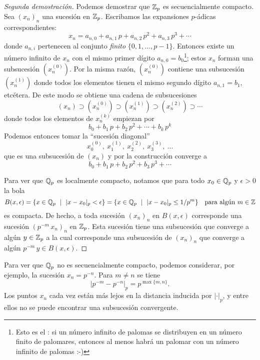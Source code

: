 \documentclass{article}
\numberwithin{equation}{section}
\theoremstyle{definition}
\begin{document}
\begin{proof}[Segunda demostración]
  Podemos demostrar que $\mathbb{Z}_p$ es secuencialmente compacto. Sea $(x_n)_n$ una
  sucesión en $\mathbb{Z}_p$. Escribamos las expansiones $p$-ádicas correspondientes:
  $$x_n = a_{n,0} + a_{n,1}\,p + a_{n,2}\,p^2 + a_{n,3}\,p^3 + \cdots$$
  donde $a_{n,i}$ pertenecen al conjunto \emph{finito}
  $\{ 0, 1, \ldots, p-1 \}$. Entonces existe un número infinito de $x_n$
  con el mismo primer dígito $a_{n,0} = b_0$\footnote{Esto es el : si un número infinito de palomas se distribuyen en
    un número finito de palomares, entonces al menos habrá un palomar con un
    número infinito de palomas :-)}; estos $x_n$ forman una subsucesión
  $(x_n^{(0)})$. Por la misma razón, $(x_n^{(0)})$ contiene una subsucesión
  $(x_n^{(1)})$ donde todos los elementos tienen el mismo segundo dígito
  $a_{n,1} = b_1$, etcétera. De este modo se obtiene una cadena de subsucesiones
  $$(x_n) \supset (x_n^{(0)}) \supset (x_n^{(1)}) \supset (x_n^{(2)}) \supset \cdots$$
  donde todos los elementos de $x_n^{(k)}$ empiezan por
  $$b_0 + b_1\,p + b_2\,p^2 + \cdots + b_k\,p^k$$
  Podemos entonces tomar la ``sucesión diagonal''
  $$x_0^{(0)}, ~ x_1^{(1)}, ~ x_2^{(2)}, ~ x_3^{(3)}, ~ \ldots$$
  que es una subsucesión de $(x_n)$ y por la construcción converge a
  $$b_0 + b_1\,p + b_2\,p^2 + b_3\,p^3 + \cdots$$

  Para ver que $\mathbb{Q}_p$ es localmente compacto, notamos que para todo
  $x_0\in \mathbb{Q}_p$ y $\epsilon > 0$ la bola
  \[ B (x,\epsilon) =
     \{ x \in \mathbb{Q}_p ~\mid~ |x-x_0|_p < \epsilon \} =
     \{ x \in \mathbb{Q}_p ~\mid~ |x-x_0|_p \le 1/p^m \}
     \quad\text{para algún }m\in\mathbb{Z} \]
  es compacta. De hecho, a toda sucesión $(x_n)_n$ en $B (x,\epsilon)$
  corresponde una sucesión $(p^{-m}\,x_n)_n$ en $\mathbb{Z}_p$. Esta sucesión tiene
  una subsucesión que converge a algún $y\in\mathbb{Z}_p$ a la cual corresponde
  una subsucesión de $(x_n)_n$ que converge a algún
  $p^{-m}\,y\in B (x,\epsilon)$.
\end{proof}

Para ver que $\mathbb{Q}_p$ no es secuencialmente compacto, podemos considerar, por
ejemplo, la sucesión $x_n = p^{-n}$. Para $m\ne n$ se tiene
$$|p^{-m} - p^{-n}|_p = p^{\max \{ m, n \}}.$$
Los puntos $x_n$ cada vez están más lejos en la distancia inducida por
$|\cdot|_p$, y entre ellos no se puede encontrar una subsucesión convergente.

\end{document}
